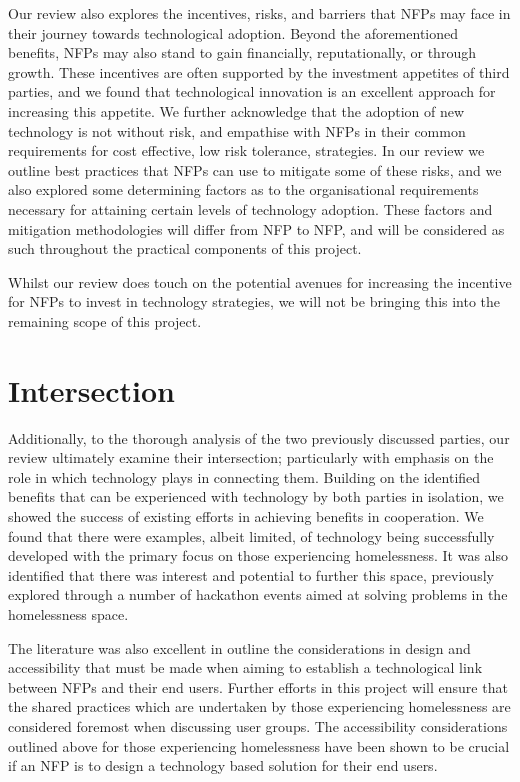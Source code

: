 Our review also explores the incentives, risks, and barriers that NFPs may face in their journey towards technological adoption. Beyond the aforementioned benefits, NFPs may also stand to gain financially, reputationally, or through growth. These incentives are often supported by the investment appetites of third parties, and we found that technological innovation is an excellent approach for increasing this appetite. We further acknowledge that the adoption of new technology is not without risk, and empathise with NFPs in their common requirements for cost effective, low risk tolerance, strategies. In our review we outline best practices that NFPs can use to mitigate some of these risks, and we also explored some determining factors as to the organisational requirements necessary for attaining certain levels of technology adoption. These factors and mitigation methodologies will differ from NFP to NFP, and will be considered as such throughout the practical components of this project.

Whilst our review does touch on the potential avenues for increasing the incentive for NFPs to invest in technology strategies, we will not be bringing this into the remaining scope of this project.

\section{Intersection}

Additionally, to the thorough analysis of the two previously discussed parties, our review ultimately examine their intersection; particularly with emphasis on the role in which technology plays in connecting them. Building on the identified benefits that can be experienced with technology by both parties in isolation, we showed the success of existing efforts in achieving benefits in cooperation. We found that there were examples, albeit limited, of technology being successfully developed with the primary focus on those experiencing homelessness. It was also identified that there was interest and potential to further this space, previously explored through a number of hackathon events aimed at solving problems in the homelessness space.

The literature was also excellent in outline the considerations in design and accessibility that must be made when aiming to establish a technological link between NFPs and their end users. Further efforts in this project will ensure that the shared practices which are undertaken by those experiencing homelessness are considered foremost when discussing user groups. The accessibility considerations outlined above for those experiencing homelessness have been shown to be crucial if an NFP is to design a technology based solution for their end users.

